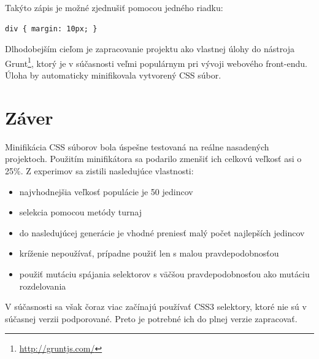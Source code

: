 Takýto zápis je možné zjednušiť pomocou jedného riadku:

\begin{verbatim}
div { margin: 10px; }
\end{verbatim}

Dlhodobejším cieľom je zapracovanie projektu ako vlastnej úlohy do nástroja Grunt\footnote{\url{http://gruntjs.com/}}, ktorý je v súčasnosti veľmi populárnym pri vývoji webového front-endu. Úloha by automaticky minifikovala vytvorený CSS súbor.

\newpage
\section{Záver} %
\label{sec:z_ver}

Minifikácia CSS súborov bola úspešne testovaná na reálne nasadených projektoch. Použitím minifikátora sa podarilo zmenšiť ich celkovú veľkosť asi o 25\%. Z experimov sa zistili nasledujúce vlastnosti:

\begin{itemize}
\item najvhodnejšia veľkosť populácie je 50 jedincov
\item selekcia pomocou metódy turnaj
\item do nasledujúcej generácie je vhodné preniesť malý počet najlepších jedincov
\item kríženie nepoužívať, prípadne použiť len s malou pravdepodobnosťou
\item použiť mutáciu spájania selektorov s väčšou pravdepodobnosťou ako mutáciu rozdelovania
\end{itemize}

V súčasnosti sa však čoraz viac začínajú používať CSS3 selektory, ktoré nie sú v súčasnej verzii podporované. Preto je potrebné ich do plnej verzie zapracovať.

